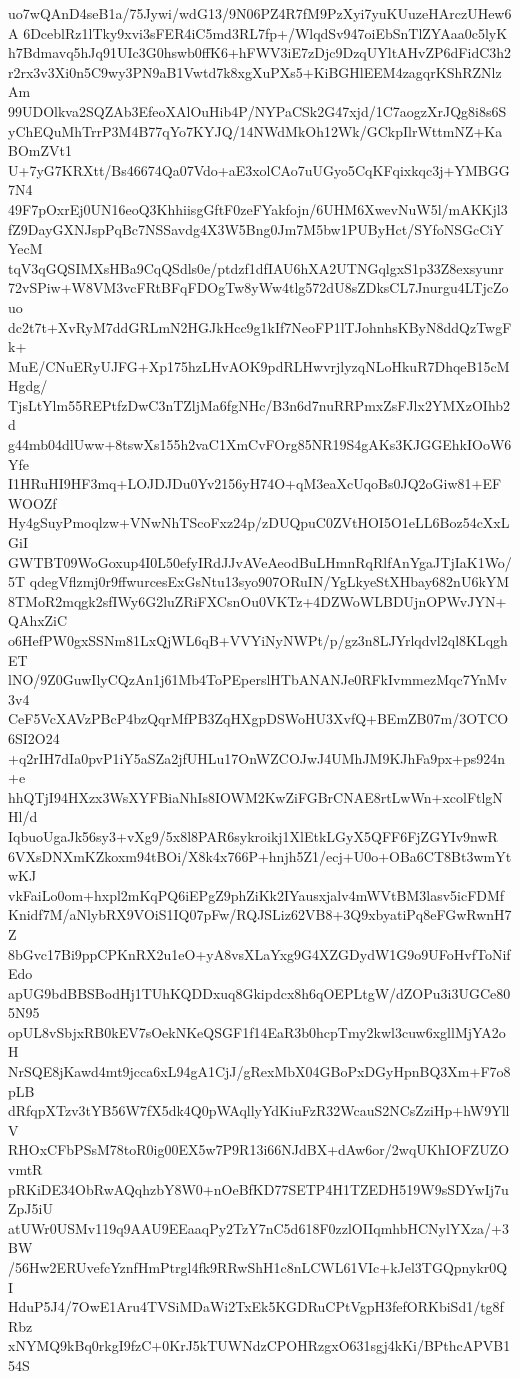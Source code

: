 uo7wQAnD4seB1a/75Jywi/wdG13/9N06PZ4R7fM9PzXyi7yuKUuzeHArczUHew6A
6DceblRz1lTky9xvi3sFER4iC5md3RL7fp+/WlqdSv947oiEbSnTlZYAaa0c5lyK
h7Bdmavq5hJq91UIc3G0hswb0ffK6+hFWV3iE7zDjc9DzqUYltAHvZP6dFidC3h2
r2rx3v3Xi0n5C9wy3PN9aB1Vwtd7k8xgXuPXs5+KiBGHlEEM4zagqrKShRZNlzAm
99UDOlkva2SQZAb3EfeoXAlOuHib4P/NYPaCSk2G47xjd/1C7aogzXrJQg8i8s6S
yChEQuMhTrrP3M4B77qYo7KYJQ/14NWdMkOh12Wk/GCkpIlrWttmNZ+KaBOmZVt1
U+7yG7KRXtt/Bs46674Qa07Vdo+aE3xolCAo7uUGyo5CqKFqixkqc3j+YMBGG7N4
49F7pOxrEj0UN16eoQ3KhhiisgGftF0zeFYakfojn/6UHM6XwevNuW5l/mAKKjl3
fZ9DayGXNJspPqBc7NSSavdg4X3W5Bng0Jm7M5bw1PUByHct/SYfoNSGcCiYYecM
tqV3qGQSIMXsHBa9CqQSdls0e/ptdzf1dfIAU6hXA2UTNGqlgxS1p33Z8exsyunr
72vSPiw+W8VM3vcFRtBFqFDOgTw8yWw4tlg572dU8sZDksCL7Jnurgu4LTjcZouo
dc2t7t+XvRyM7ddGRLmN2HGJkHcc9g1kIf7NeoFP1lTJohnhsKByN8ddQzTwgFk+
MuE/CNuERyUJFG+Xp175hzLHvAOK9pdRLHwvrjlyzqNLoHkuR7DhqeB15cMHgdg/
TjsLtYlm55REPtfzDwC3nTZljMa6fgNHc/B3n6d7nuRRPmxZsFJlx2YMXzOIhb2d
g44mb04dlUww+8tswXs155h2vaC1XmCvFOrg85NR19S4gAKs3KJGGEhkIOoW6Yfe
I1HRuHI9HF3mq+LOJDJDu0Yv2156yH74O+qM3eaXcUqoBs0JQ2oGiw81+EFWOOZf
Hy4gSuyPmoqlzw+VNwNhTScoFxz24p/zDUQpuC0ZVtHOI5O1eLL6Boz54cXxLGiI
GWTBT09WoGoxup4I0L50efyIRdJJvAVeAeodBuLHmnRqRlfAnYgaJTjIaK1Wo/5T
qdegVflzmj0r9ffwurcesExGsNtu13syo907ORuIN/YgLkyeStXHbay682nU6kYM
8TMoR2mqgk2sfIWy6G2luZRiFXCsnOu0VKTz+4DZWoWLBDUjnOPWvJYN+QAhxZiC
o6HefPW0gxSSNm81LxQjWL6qB+VVYiNyNWPt/p/gz3n8LJYrlqdvl2ql8KLqghET
lNO/9Z0GuwIlyCQzAn1j61Mb4ToPEperslHTbANANJe0RFkIvmmezMqc7YnMv3v4
CeF5VcXAVzPBcP4bzQqrMfPB3ZqHXgpDSWoHU3XvfQ+BEmZB07m/3OTCO6SI2O24
+q2rIH7dIa0pvP1iY5aSZa2jfUHLu17OnWZCOJwJ4UMhJM9KJhFa9px+ps924n+e
hhQTjI94HXzx3WsXYFBiaNhIs8IOWM2KwZiFGBrCNAE8rtLwWn+xcolFtlgNHl/d
IqbuoUgaJk56sy3+vXg9/5x8l8PAR6sykroikj1XlEtkLGyX5QFF6FjZGYIv9nwR
6VXsDNXmKZkoxm94tBOi/X8k4x766P+hnjh5Z1/ecj+U0o+OBa6CT8Bt3wmYtwKJ
vkFaiLo0om+hxpl2mKqPQ6iEPgZ9phZiKk2IYausxjalv4mWVtBM3lasv5icFDMf
Knidf7M/aNlybRX9VOiS1IQ07pFw/RQJSLiz62VB8+3Q9xbyatiPq8eFGwRwnH7Z
8bGvc17Bi9ppCPKnRX2u1eO+yA8vsXLaYxg9G4XZGDydW1G9o9UFoHvfToNifEdo
apUG9bdBBSBodHj1TUhKQDDxuq8Gkipdcx8h6qOEPLtgW/dZOPu3i3UGCe805N95
opUL8vSbjxRB0kEV7sOekNKeQSGF1f14EaR3b0hcpTmy2kwl3cuw6xgllMjYA2oH
NrSQE8jKawd4mt9jcca6xL94gA1CjJ/gRexMbX04GBoPxDGyHpnBQ3Xm+F7o8pLB
dRfqpXTzv3tYB56W7fX5dk4Q0pWAqllyYdKiuFzR32WcauS2NCsZziHp+hW9YllV
RHOxCFbPSsM78toR0ig00EX5w7P9R13i66NJdBX+dAw6or/2wqUKhIOFZUZOvmtR
pRKiDE34ObRwAQqhzbY8W0+nOeBfKD77SETP4H1TZEDH519W9sSDYwIj7uZpJ5iU
atUWr0USMv119q9AAU9EEaaqPy2TzY7nC5d618F0zzlOIIqmhbHCNylYXza/+3BW
/56Hw2ERUvefcYznfHmPtrgl4fk9RRwShH1c8nLCWL61VIc+kJel3TGQpnykr0QI
HduP5J4/7OwE1Aru4TVSiMDaWi2TxEk5KGDRuCPtVgpH3fefORKbiSd1/tg8fRbz
xNYMQ9kBq0rkgI9fzC+0KrJ5kTUWNdzCPOHRzgxO631sgj4kKi/BPthcAPVB154S
